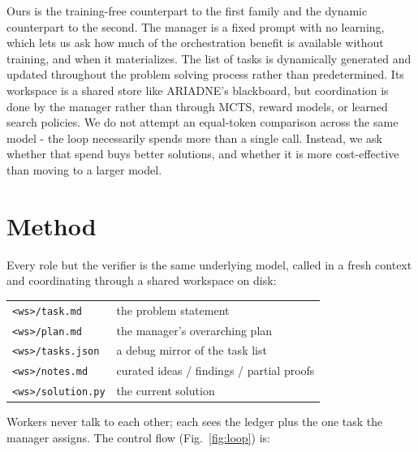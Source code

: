 \documentclass[journal]{IEEEtran}
\begin{document}
Ours is the training-free counterpart to the first family and the dynamic counterpart to the
second. The manager is a fixed prompt with no learning, which lets us ask how much of the
orchestration benefit is available without training, and when it materializes. The list of tasks is dynamically generated and updated throughout the problem solving process rather than predetermined.
Its workspace is a shared store like ARIADNE's blackboard, but coordination is done by the manager
rather than through MCTS, reward models, or learned search policies. We do not attempt
an equal-token comparison across the same model - the loop necessarily spends more than a single call. 
Instead, we ask whether that spend buys better solutions, and whether it is more cost-effective than moving to a larger model.

\section{Method}
\label{sec:method}

Every role but the verifier is the same underlying model, called in a fresh context and
coordinating through a shared workspace on disk:

\begin{center}
\small
\begin{tabular}{@{}ll@{}}
\texttt{<ws>/task.md}     & the problem statement \\
\texttt{<ws>/plan.md}     & the manager's overarching plan \\
\texttt{<ws>/tasks.json}  & a debug mirror of the task list \\
\texttt{<ws>/notes.md}    & curated ideas / findings / partial proofs \\
\texttt{<ws>/solution.py} & the current solution \\
\end{tabular}
\end{center}

Workers never talk to each other; each sees the ledger plus the one task the manager
assigns. The control flow (Fig.~\ref{fig:loop}) is:
\end{document}
